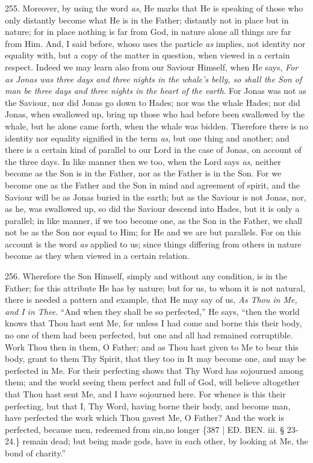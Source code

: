 255.
Moreover, by using the word \emph{as}, He marks that He is speaking of
those who only distantly become what He is in the Father; distantly
not in place but in nature; for in place nothing is far from God, in
nature alone all things are far from Him. And, I said before, whoso
uses the particle \emph{as} implies, not identity nor equality with,
but a copy of the matter in question, when viewed in a certain
respect. Indeed we may learn also from our Saviour Himself, when He
says, \emph{For as Jonas was three days and three nights in the whale's
belly, so shall the Son of man be three days and three nights in the
heart of the earth}. For Jonas was not as the Saviour, nor did
Jonas go down to Hades; nor was the whale Hades; nor did Jonas, when
swallowed up, bring up those who had before been swallowed by the
whale, but he alone came forth, when the whale was bidden.
Therefore there is no identity nor equality signified in the term \emph{as},
but one thing and another; and there is a certain kind of parallel to
our Lord in the case of Jonas, on account of the three days. In like
manner then we too, when the Lord says \emph{as}, neither become as
the Son is in the Father, nor as the Father is in the Son. For we
become one as the Father and the Son in mind and agreement of spirit,
and the Saviour will be as Jonas buried in the earth; but as the
Saviour is not Jonas, nor, as he, was swallowed up, so did the Saviour
descend into Hades, but it is only a parallel; in like manner, if we
too become one, as the Son in the Father, we shall not be as the Son
nor equal to Him; for He and we are but parallels. For on this account
is the word \emph{as} applied to us; since things differing from
others in nature become as they when viewed in a certain relation.

256.
Wherefore the Son Himself, simply and without any condition, is in the
Father; for this attribute He has by nature; but for us, to whom it is
not natural, there is needed a pattern and example, that He may say of
us, \emph{As Thou in Me, and I in Thee}. ``And when they shall be so
perfected,'' He says, ``then the world knows that Thou hast sent Me, for
unless I had come and borne this their body, no one of them had been
perfected, but one and all had remained corruptible. Work Thou then in
them, O Father; and as Thou hast given to Me to bear this body, grant
to them Thy Spirit, that they too in It may become one, and may be
perfected in Me. For their perfecting shows that Thy Word has
sojourned among them; and the world seeing them perfect and full of
God, will believe altogether that Thou hast sent Me, and I have
sojourned here. For whence is this their perfecting, but that I, Thy
Word, having borne their body, and become man, have perfected the work
which Thou gavest Me, O Father? And the work is perfected, because
men, redeemed from sin,\emph{}no longer \{387 | ED.
BEN.
iii. § 23-24.\} remain dead; but being made gods, have in each other,
by looking at Me, the bond of charity.''

